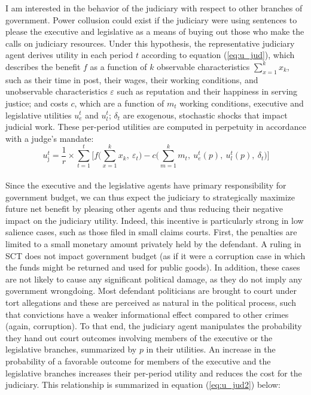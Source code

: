 \documentclass[11pt]{article}
\newcommand{\refp}[1]{(\ref{#1})}
\begin{document}
I am interested in the behavior of the judiciary with respect to other branches of government. Power collusion could exist if the judiciary were using sentences to please the executive and legislative as a means of buying out those who make the calls on judiciary resources. Under this hypothesis, the representative judiciary agent derives utility in each period $t$ according to equation \refp{eq:u_jud}, which describes the benefit $f$ as a function of $k$ observable characteristics $\sum_{x = 1}^{k}x_{k}$, such as their time in post, their wages, their working conditions, and unobservable characteristics $\varepsilon$ such as reputation and their happiness in serving justice; and costs $c$, which are a function of $m_{t}$ working conditions, executive and legislative utilities $u_{e}^{t}$ and $u_{l}^{t}$; $\delta_{t}$ are exogenous, stochastic shocks that impact judicial work. These per-period utilities are computed in perpetuity in accordance with a judge's mandate: \\

\begin{equation} \label{eq:u_jud}
  u_{\text{j}}^{t} = \frac{1}{r} \times \sum_{t = 1}^{t} \Bigg[ f\Big(\sum_{x = 1}^{k}x_{k}, \ \varepsilon_{t} \Big) - c\Big(\sum_{m = 1}^{k} m_{t}, \ u_{e}^{t}(p), \ u_{l}^{t}(p), \ \delta_{t}\Big) \Bigg]
\end{equation} \\

Since the executive and the legislative agents have primary responsibility for government budget, we can thus expect the judiciary to strategically maximize future net benefit by pleasing other agents and thus reducing their negative impact on the judiciary utility. Indeed, this incentive is particularly strong in low salience cases, such as those filed in small claims courts. First, the penalties are limited to a small monetary amount privately held by the defendant. A ruling in SCT does not impact government budget (as if it were a corruption case in which the funds might be returned and used for public goods). In addition, these cases are not likely to cause any significant political damage, as they do not imply any government wrongdoing. Most defendant politicians are brought to court under tort allegations and these are perceived as natural in the political process, such that convictions have a weaker informational effect compared to other crimes (again, corruption). To that end, the judiciary agent manipulates the probability they hand out court outcomes involving members of the executive or the legislative branches, summarized by $p$ in their utilities. An increase in the probability of a favorable outcome for members of the executive and the legislative branches increases their per-period utility and reduces the cost for the judiciary. This relationship is summarized in equation \refp{eq:u_jud2} below: \\
\end{document}

